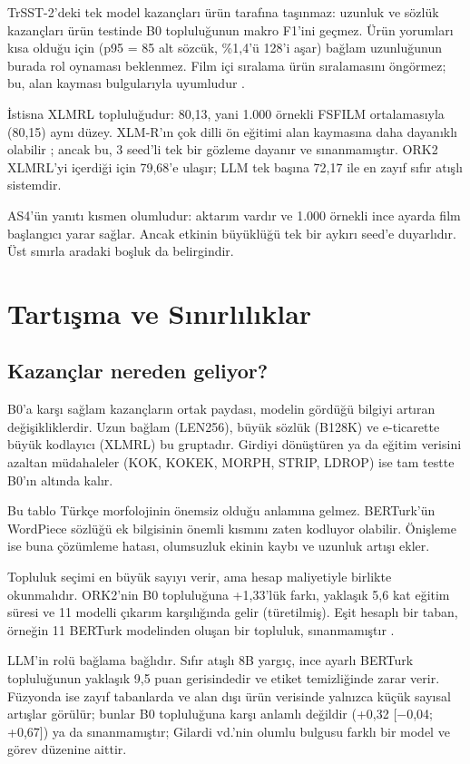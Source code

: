 \documentclass[11pt]{article}
\begin{document}
TrSST-2'deki tek model kazançları ürün tarafına taşınmaz: uzunluk ve sözlük kazançları ürün testinde B0 topluluğunun makro F1'ini geçmez. Ürün yorumları kısa olduğu için (p95 = 85 alt sözcük, \%1,4'ü 128'i aşar) bağlam uzunluğunun burada rol oynaması beklenmez. Film içi sıralama ürün sıralamasını öngörmez; bu, alan kayması bulgularıyla uyumludur \citep{blitzer2007}.

İstisna XLMRL topluluğudur: 80,13, yani 1.000 örnekli FSFILM ortalamasıyla (80,15) aynı düzey. XLM-R'ın çok dilli ön eğitimi alan kaymasına daha dayanıklı olabilir \citep{conneau2020}; ancak bu, 3 seed'li tek bir gözleme dayanır ve sınanmamıştır. ORK2 XLMRL'yi içerdiği için 79,68'e ulaşır; LLM tek başına 72,17 ile en zayıf sıfır atışlı sistemdir.

AS4'ün yanıtı kısmen olumludur: aktarım vardır ve 1.000 örnekli ince ayarda film başlangıcı yarar sağlar. Ancak etkinin büyüklüğü tek bir aykırı seed'e duyarlıdır. Üst sınırla aradaki boşluk da belirgindir.

\section{Tartışma ve Sınırlılıklar}\label{sec:8}

\subsection{Kazançlar nereden geliyor?}

B0'a karşı sağlam kazançların ortak paydası, modelin gördüğü bilgiyi artıran değişikliklerdir. Uzun bağlam (LEN256), büyük sözlük (B128K) ve e-ticarette büyük kodlayıcı (XLMRL) bu gruptadır. Girdiyi dönüştüren ya da eğitim verisini azaltan müdahaleler (KOK, KOKEK, MORPH, STRIP, LDROP) ise tam testte B0'ın altında kalır.

Bu tablo Türkçe morfolojinin önemsiz olduğu anlamına gelmez. BERTurk'ün WordPiece sözlüğü ek bilgisinin önemli kısmını zaten kodluyor olabilir. Önişleme ise buna çözümleme hatası, olumsuzluk ekinin kaybı ve uzunluk artışı ekler.

Topluluk seçimi en büyük sayıyı verir, ama hesap maliyetiyle birlikte okunmalıdır. ORK2'nin B0 topluluğuna +1,33'lük farkı, yaklaşık 5,6 kat eğitim süresi ve 11 modelli çıkarım karşılığında gelir (türetilmiş). Eşit hesaplı bir taban, örneğin 11 BERTurk modelinden oluşan bir topluluk, sınanmamıştır \citep{lakshminarayanan2017,caruana2004}.

LLM'in rolü bağlama bağlıdır. Sıfır atışlı 8B yargıç, ince ayarlı BERTurk topluluğunun yaklaşık 9,5 puan gerisindedir ve etiket temizliğinde zarar verir. Füzyonda ise zayıf tabanlarda ve alan dışı ürün verisinde yalnızca küçük sayısal artışlar görülür; bunlar B0 topluluğuna karşı anlamlı değildir (+0,32 [$-$0,04; +0,67]) ya da sınanmamıştır; Gilardi vd.'nin olumlu bulgusu \citep{gilardi2023} farklı bir model ve görev düzenine aittir.
\end{document}
